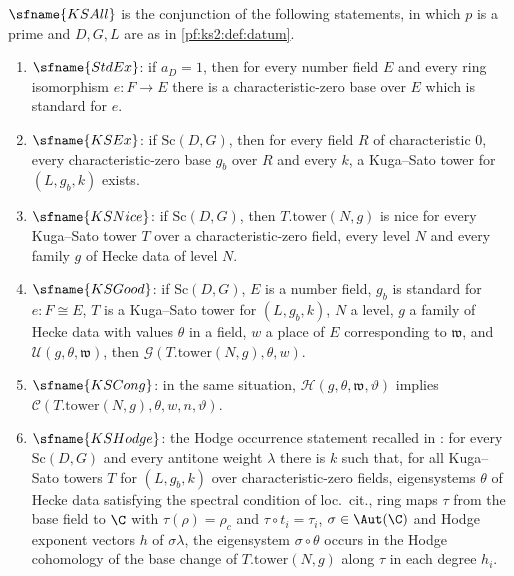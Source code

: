 \begin{definition}\label{pf:ks2:def:ksall}
$\sfname{KSAll}$ is the conjunction of the following
statements, in which $p$ is a prime and $D,G,L$ are as in \cref{pf:ks2:def:datum}.
\begin{enumerate}[label=(\alph*)]
\item $\sfname{StdEx}$: if $a_D=1$, then for every number
  field $E$ and every ring isomorphism $e\colon F\to E$ there is a characteristic-zero base over $E$
  which is standard for $e$.
\item $\sfname{KSEx}$: if $\mathrm{Sc}(D,G)$, then for every
  field $R$ of characteristic $0$, every characteristic-zero base $g_b$ over $R$ and every $k$,
  a Kuga--Sato tower for $(L,g_b,k)$ exists.
\item $\sfname{KSNice}$: if $\mathrm{Sc}(D,G)$, then
  $T.\mathrm{tower}(N,g)$ is nice for every Kuga--Sato tower $T$ over a characteristic-zero field,
  every level $N$ and every family $g$ of Hecke data of level $N$.
\item $\sfname{KSGood}$: if $\mathrm{Sc}(D,G)$, $E$ is a
  number field, $g_b$ is standard for $e\colon F\cong E$, $T$ is a Kuga--Sato tower for
  $(L,g_b,k)$, $N$ a level, $g$ a family of Hecke data with values $\theta$ in a field, $w$ a place
  of $E$ corresponding to $\mathfrak w$, and $\mathcal{U}(g,\theta,\mathfrak w)$, then
  $\mathcal{G}(T.\mathrm{tower}(N,g),\theta,w)$.
\item $\sfname{KSCong}$: in the same situation,
  $\mathcal{H}(g,\theta,\mathfrak w,\vartheta)$ implies
  $\mathcal{C}(T.\mathrm{tower}(N,g),\theta,w,n,\vartheta)$.
\item $\sfname{KSHodge}$: the Hodge occurrence statement
  recalled in : for every
  $\mathrm{Sc}(D,G)$ and every antitone weight $\lambda$ there is $k$ such that, for all Kuga--Sato
  towers $T$ for $(L,g_b,k)$ over characteristic-zero fields, eigensystems $\theta$ of Hecke data
  satisfying the spectral condition of loc.\ cit., ring maps $\tau$ from the base field to $\C$
  with $\tau(\rho)=\rho_c$ and $\tau\circ t_i=\tau_i$, $\sigma\in\Aut(\C)$ and Hodge exponent vectors
  $h$ of $\sigma\lambda$, the eigensystem $\sigma\circ\theta$ occurs in the Hodge cohomology of the
  base change of $T.\mathrm{tower}(N,g)$ along $\tau$ in each degree $h_i$.
\end{enumerate}
\end{definition}

